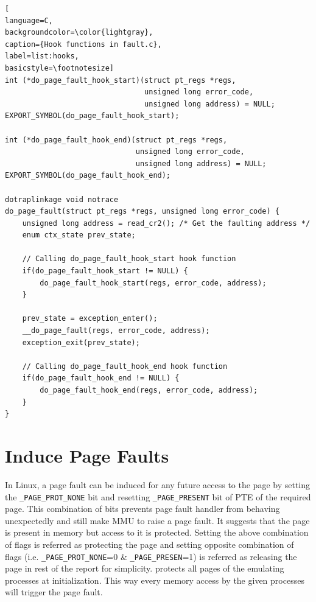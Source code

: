 \begin{lstlisting}[
language=C,
backgroundcolor=\color{lightgray},
caption={Hook functions in fault.c},
label=list:hooks,
basicstyle=\footnotesize]
int (*do_page_fault_hook_start)(struct pt_regs *regs,
                                unsigned long error_code,
                                unsigned long address) = NULL;
EXPORT_SYMBOL(do_page_fault_hook_start);

int (*do_page_fault_hook_end)(struct pt_regs *regs,
                              unsigned long error_code,
                              unsigned long address) = NULL;
EXPORT_SYMBOL(do_page_fault_hook_end);

dotraplinkage void notrace
do_page_fault(struct pt_regs *regs, unsigned long error_code) {
    unsigned long address = read_cr2(); /* Get the faulting address */
    enum ctx_state prev_state;
    
    // Calling do_page_fault_hook_start hook function
    if(do_page_fault_hook_start != NULL) {
        do_page_fault_hook_start(regs, error_code, address);
    }

    prev_state = exception_enter();
    __do_page_fault(regs, error_code, address);
    exception_exit(prev_state);

    // Calling do_page_fault_hook_end hook function
    if(do_page_fault_hook_end != NULL) {
        do_page_fault_hook_end(regs, error_code, address);
    }
}
\end{lstlisting}


\section{Induce Page Faults}

In Linux, a page fault can be induced for any future access to the page by setting the \verb|_PAGE_PROT_NONE| bit and resetting \verb|_PAGE_PRESENT| bit of PTE of the required page. This combination of bits prevents page fault handler from behaving unexpectedly and still make MMU to raise a page fault. It suggests that the page is present in memory but access to it is protected. Setting the above combination of flags is referred as protecting the page and setting opposite combination of flags (i.e. \verb|_PAGE_PROT_NONE|=0 \& \verb|_PAGE_PRESEN|=1) is referred as releasing the page in rest of the report for simplicity.
{\dime} protects all pages of the emulating processes at initialization. This way every memory access by the given processes will trigger the page fault.


